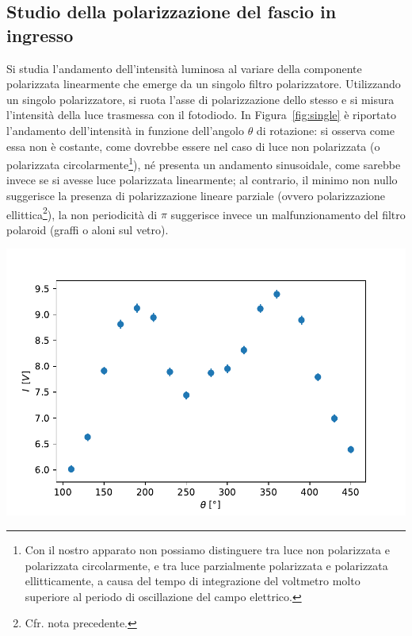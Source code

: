 \documentclass[10pt,oneside,a4paper]{article}
\newenvironment{Figure}
  {\par\medskip\noindent\minipage{\linewidth}}
  {\endminipage\par\medskip}
\begin{document}
\begin{multicols}{2}
\subsection{Studio della polarizzazione del fascio in ingresso}\label{sec:polarizzazione}
Si studia l'andamento dell'intensità luminosa al variare della componente polarizzata linearmente che emerge da un singolo filtro polarizzatore. Utilizzando un singolo polarizzatore, si ruota l'asse di polarizzazione dello stesso e si misura l'intensità della luce trasmessa con il fotodiodo. In Figura~\ref{fig:single} è riportato l'andamento dell'intensità in funzione dell'angolo $\theta$ di rotazione: si osserva come essa non è costante, come dovrebbe essere nel caso di luce non polarizzata (o polarizzata circolarmente\footnote{Con il nostro apparato non possiamo distinguere tra luce non polarizzata e polarizzata circolarmente, e tra luce parzialmente polarizzata e polarizzata ellitticamente, a causa del tempo di integrazione del voltmetro molto superiore al periodo di oscillazione del campo elettrico.}), né presenta un andamento sinusoidale, come sarebbe invece se si avesse luce polarizzata linearmente; al contrario, il minimo non nullo suggerisce la presenza di polarizzazione lineare parziale (ovvero polarizzazione ellittica\footnote{Cfr. nota precedente.}), la non periodicità di $\pi$ suggerisce invece un malfunzionamento del filtro polaroid (graffi o aloni sul vetro).

\begin{Figure}
	\begin{center}
	\includegraphics[width=\linewidth]{single.pdf}
	\label{fig:single}
	\end{center}
\end{Figure}


\end{multicols}
\end{document}
